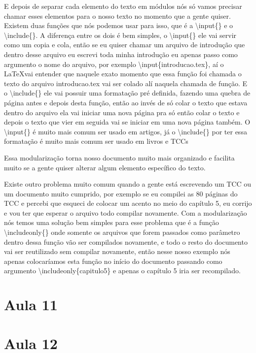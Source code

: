 E depois de separar cada elemento do texto em módulos nós só vamos precisar chamar esses elementos para o nosso texto no momento que a gente quiser. Existem duas funções que nós podemos usar para isso, que é a \textbackslash input\{\} e o \textbackslash include\{\}. A diferença entre os dois é bem simples, o \textbackslash input\{\} ele vai servir como um copia e cola, então se eu quiser chamar um arquivo de introdução que dentro desse arquivo eu escrevi toda minha introdução eu apenas passo como argumento o nome do arquivo, por exemplo \textbackslash input\{introducao.tex\}, aí o \LaTeX vai entender que naquele exato momento que essa função foi chamada o texto do arquivo introducao.tex vai ser colado alí naquela chamada de função. E o \textbackslash include\{\} ele vai possuir uma formatação pré definida, fazendo uma quebra de página antes e depois desta função, então ao invés de só colar o texto que estava dentro do arquivo ela vai iniciar uma nova página pra só então colar o texto e depois o texto que vier em seguida vai se iniciar em uma nova página também. O \textbackslash input\{\} é muito mais comum ser usado em artigos, já o \textbackslash include\{\} por ter essa formatação é muito mais comum ser usado em livros e TCCs 

Essa modularização torna nosso documento muito mais organizado e facilita muito se a gente quiser alterar algum elemento específico do texto.

Existe outro problema muito comum quando a gente está escrevendo um TCC ou um documento muito cumprido, por exemplo se eu compilei as 80 páginas do TCC e percebi que esqueci de colocar um acento no meio do capítulo 5, eu corrijo e vou ter que esperar o arquivo todo compilar novamente. Com a modularização nós temos uma solução bem simples para esse problema que é a função \textbackslash includeonly\{\} onde somente os arquivos que forem passados como parâmetro dentro dessa função vão ser compilados novamente, e todo o resto do documento vai ser reutilizado sem compilar novamente, então nesse nosso exemplo nós apenas colocaríamos esta função no início do documento passando como argumento \textbackslash includeonly\{capitulo5\} e apenas o capítulo 5 iria ser recompilado.


\section{Aula 11}
\lipsum[1 - 3]

\section{Aula 12}
\lipsum[1 - 3]
